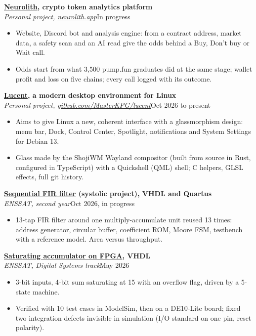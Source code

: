 \documentclass[10pt,a4paper]{article}
\newcommand{\entry}[3]{%
  \par\addvspace{6pt}%
  \noindent\textbf{#1}\\
  \textit{#2}\hfill #3\par
}
\newcommand{\project}[2]{\href{https://masterkpg.github.io/\#project-#1}{#2}}
\begin{document}
\entry{\project{neurolith}{Neurolith}, crypto token analytics platform}{Personal project, \href{https://neurolith.app}{neurolith.app}}{In progress}
\begin{itemize}
  \item Website, Discord bot and analysis engine: from a contract address, market data, a safety
        scan and an AI read give the odds behind a Buy, Don't buy or Wait call.
  \item Odds start from what 3,500 pump.fun graduates did at the same stage; wallet profit and loss
        on five chains; every call logged with its outcome.
\end{itemize}

\entry{\project{lucent}{Lucent}, a modern desktop environment for Linux}{Personal project, \href{https://github.com/MasterKPG/lucent}{github.com/MasterKPG/lucent}}{Oct 2026 to present}
\begin{itemize}
  \item Aims to give Linux a new, coherent interface with a glassmorphism design: menu bar, Dock,
        Control Center, Spotlight, notifications and System Settings for Debian 13.
  \item Glass made by the ShojiWM Wayland compositor (built from source in Rust, configured in
        TypeScript) with a Quickshell (QML) shell; C helpers, GLSL effects, full git history.
\end{itemize}

\entry{\project{fir-filter}{Sequential FIR filter} (systolic project), VHDL and Quartus}{ENSSAT, second year}{Oct 2026, in progress}
\begin{itemize}
  \item 13-tap FIR filter around one multiply-accumulate unit reused 13 times: address generator,
        circular buffer, coefficient ROM, Moore FSM, testbench with a reference model. Area versus
        throughput.
\end{itemize}

\entry{\project{saturating-accumulator}{Saturating accumulator on FPGA}, VHDL}{ENSSAT, Digital Systems track}{May 2026}
\begin{itemize}
  \item 3-bit inputs, 4-bit sum saturating at 15 with an overflow flag, driven by a 5-state machine.
  \item Verified with 10 test cases in ModelSim, then on a DE10-Lite board; fixed two integration
        defects invisible in simulation (I/O standard on one pin, reset polarity).
\end{itemize}
\end{document}
